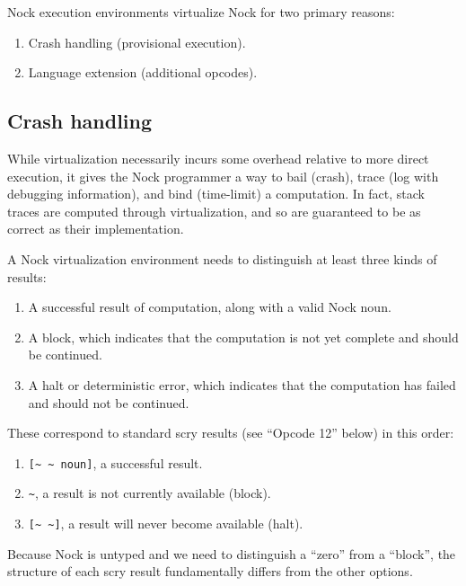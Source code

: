 \documentclass[twoside]{article}
\begin{document}
\noindent


Nock execution environments virtualize Nock for two primary reasons:

\begin{enumerate}
  \item  Crash handling (provisional execution).
  \item  Language extension (additional opcodes).
\end{enumerate}

\subsection{Crash handling}

While virtualization necessarily incurs some overhead relative to more direct execution, it gives the Nock programmer a way to bail (crash), trace (log with debugging information), and bind (time-limit) a computation.  In fact, stack traces are computed through virtualization, and so are guaranteed to be as correct as their implementation.

A Nock virtualization environment needs to distinguish at least three kinds of results:

\begin{enumerate}
  \item  A successful result of computation, along with a valid Nock noun.
  \item  A block, which indicates that the computation is not yet complete and should be continued.
  \item  A halt or deterministic error, which indicates that the computation has failed and should not be continued.
\end{enumerate}

\noindent
These correspond to standard scry results (see ``Opcode 12'' below) in this order:

\begin{enumerate}
  \item  \lstinline[style=inlinecode]{[~ ~ noun]}, a successful result.
  \item  \lstinline[style=inlinecode]{~}, a result is not currently available (block).
  \item  \lstinline[style=inlinecode]{[~ ~]}, a result will never become available (halt).
\end{enumerate}

\noindent
Because Nock is untyped and we need to distinguish a ``zero'' from a ``block'', the structure of each scry result fundamentally differs from the other options.
\end{document}
